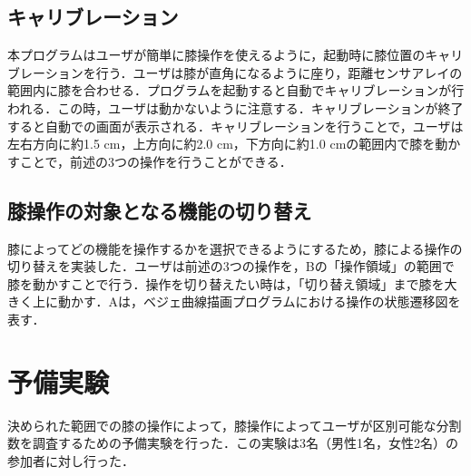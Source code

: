 \documentclass[submit, techrep]{ipsj}
\begin{document}
\subsection{キャリブレーション}
本プログラムはユーザが簡単に膝操作を使えるように，起動時に膝位置のキャリブレーションを行う．ユーザは膝が直角になるように座り，距離センサアレイの範囲内に膝を合わせる．プログラムを起動すると自動でキャリブレーションが行われる．この時，ユーザは動かないように注意する．キャリブレーションが終了すると自動での画面が表示される．キャリブレーションを行うことで，ユーザは左右方向に約1.5 \si{cm}，上方向に約2.0 \si{cm}，下方向に約1.0 \si{cm}の範囲内で膝を動かすことで，前述の3つの操作を行うことができる．\subsection{膝操作の対象となる機能の切り替え}
膝によってどの機能を操作するかを選択できるようにするため，膝による操作の切り替えを実装した．ユーザは前述の3つの操作を，Bの「操作領域」の範囲で膝を動かすことで行う．操作を切り替えたい時は，「切り替え領域」まで膝を大きく上に動かす．Aは，ベジェ曲線描画プログラムにおける操作の状態遷移図を表す．

\section{予備実験}
決められた範囲での膝の操作によって，膝操作によってユーザが区別可能な分割数を調査するための予備実験を行った．この実験は3名（男性1名，女性2名）の参加者に対し行った．
\end{document}
